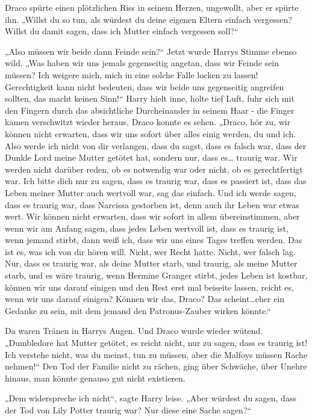{Draco spürte einen plötzlichen Riss in seinem Herzen, ungewollt, aber er spürte ihn. „Willst du so tun, als würdest du deine eigenen Eltern einfach vergessen? Willst du damit sagen, dass ich Mutter einfach vergessen soll?“

„Also müssen wir beide dann Feinde sein?“ Jetzt wurde Harrys Stimme ebenso wild. „Was haben wir uns jemals gegenseitig angetan, dass wir Feinde sein müssen? Ich weigere mich, mich in eine solche Falle locken zu lassen! Gerechtigkeit kann nicht bedeuten, dass wir beide uns gegenseitig angreifen sollten, das macht keinen Sinn!“ Harry hielt inne, holte tief Luft, fuhr sich mit den Fingern durch das absichtliche Durcheinander in seinem Haar - die Finger kamen verschwitzt wieder heraus, Draco konnte es sehen. „Draco, hör zu, wir können nicht erwarten, dass wir uns sofort über alles einig werden, du und ich. Also werde ich nicht von dir verlangen, dass du sagst, dass es falsch war, dass der Dunkle Lord meine Mutter getötet hat, sondern nur, dass es… traurig war. Wir werden nicht darüber reden, ob es notwendig war oder nicht, ob es gerechtfertigt war. Ich bitte dich nur zu sagen, dass es traurig war, dass es passiert ist, dass das Leben meiner Mutter auch wertvoll war, sag das einfach. Und ich werde sagen, dass es traurig war, dass Narcissa gestorben ist, denn auch ihr Leben war etwas wert. Wir können nicht erwarten, dass wir sofort in allem übereinstimmen, aber wenn wir am Anfang sagen, dass jedes Leben wertvoll ist, dass es traurig ist, wenn jemand stirbt, dann weiß ich, dass wir uns eines Tages treffen werden. Das ist es, was ich von dir hören will. Nicht, wer Recht hatte. Nicht, wer falsch lag. Nur, dass es traurig war, als deine Mutter starb, und traurig, als meine Mutter starb, und es wäre traurig, wenn Hermine Granger stirbt, jedes Leben ist kostbar, können wir uns darauf einigen und den Rest erst mal beiseite lassen, reicht es, wenn wir uns darauf einigen? Können wir das, Draco? Das scheint…eher ein Gedanke zu sein, mit dem jemand den Patronus-Zauber wirken könnte.“

Da waren Tränen in Harrys Augen. Und Draco wurde wieder wütend. „Dumbledore hat Mutter getötet, es reicht nicht, nur zu sagen, dass es traurig ist! Ich verstehe nicht, was du meinst, tun zu müssen, aber die Malfoys müssen Rache nehmen!“ Den Tod der Familie nicht zu rächen, ging über Schwäche, über Unehre hinaus, man könnte genauso gut nicht existieren.

„Dem widerspreche ich nicht“, sagte Harry leise. „Aber würdest du sagen, dass der Tod von Lily Potter traurig war? Nur diese eine Sache sagen?“

}
